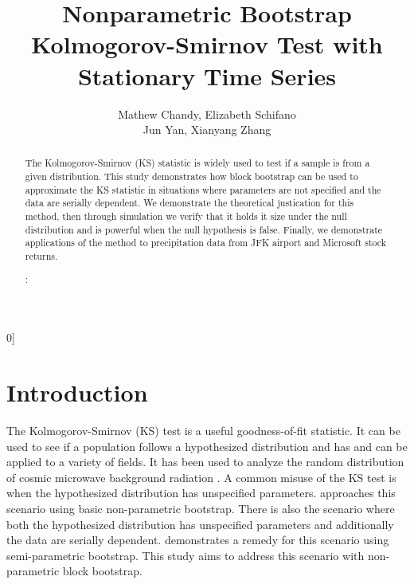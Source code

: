 \documentclass[12pt, letterpaper]{article}
\newcommand{\blind}{0]}
\begin{document}

\title{\bf Nonparametric Bootstrap Kolmogorov-Smirnov Test with Stationary 
  Time Series}
\blind
{
  \author{Mathew Chandy, %
  Elizabeth Schifano\\
  Jun Yan, %
  Xianyang Zhang\\
}
} \fi


\maketitle


\begin{abstract}

The Kolmogorov-Smirnov (KS) statistic is widely used to test if a sample is
from a given distribution. This study demonstrates how block bootstrap can be 
used to approximate the KS statistic in situations where parameters are 
not specified and the data are serially dependent. We demonstrate the 
theoretical justication for this method, then through simulation we verify that
it holds it size under the null distribution and is powerful when the null 
hypothesis is false. Finally, we demonstrate applications of the method to
precipitation data from JFK airport and Microsoft stock returns.

\bigskip
{}:
\end{abstract}

\doublespace 


\section{Introduction}
\label{sec:intro}

The Kolmogorov-Smirnov (KS) test is a useful goodness-of-fit statistic. It 
can be used to see if a population follows a hypothesized distribution and has 
and can be applied to a variety of fields. It has
been used to analyze the random distribution of cosmic microwave background 
radiation \citep{naess2012application}. A common misuse of the KS test is when
the hypothesized distribution has unspecified parameters. 
\citet{babu2004goodness} approaches this scenario using basic 
non-parametric bootstrap. There is also the scenario where both the hypothesized 
distribution has unspecified parameters and additionally the data are 
serially dependent. \citet{zeimbekakis2022misuses} demonstrates a remedy for
this scenario using semi-parametric bootstrap. This study aims to address this
scenario with non-parametric block bootstrap.
\end{document}
